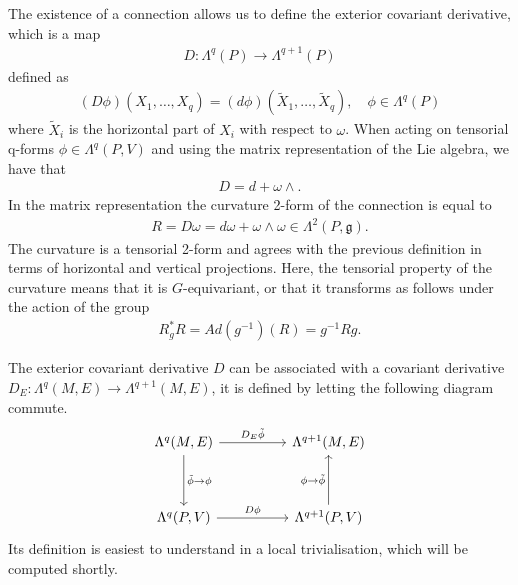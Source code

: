 \documentclass[10pt]{report}
\theoremstyle{definition}
\begin{document}
The existence of a connection allows us to define the exterior covariant derivative, which is a map
\begin{align}
    D : \Lambda^q(P) \rightarrow \Lambda^{q+1}(P)
\end{align}
defined as
\begin{align}
    (D \phi)(X_1,\ldots,X_q) = (d\phi)(\tilde{X}_1,\ldots,\tilde{X}_q), \quad \phi \in \Lambda^q(P)
\end{align}
where $\tilde{X}_i$ is the horizontal part of $X_i$ with respect to $\omega$. When acting on tensorial q-forms $\phi \in \Lambda^q(P,V)$ and using the matrix representation of the Lie algebra, we have that
\begin{align}
    D = d + \omega \wedge.
\end{align}
In the matrix representation the curvature 2-form of the connection is equal to
\begin{align}
    R = D\omega = d\omega + \omega \wedge \omega \in \Lambda^2 (P,\mathfrak{g}).
\end{align}
The curvature is a tensorial 2-form and agrees with the previous definition in terms of horizontal and vertical projections. Here, the tensorial property of the curvature means that it is $G$-equivariant, or that it transforms as follows under the action of the group
\begin{align}
    R_g^* R = Ad(g^{-1})(R) = g^{-1} R g.
\end{align}

The exterior covariant derivative $D$ can be associated with a covariant derivative $D_E : \Lambda^q(M,E) \rightarrow \Lambda^{q+1}(M,E)$, it is defined by letting the following diagram commute.
\begin{equation}
\begin{tikzcd}
{\Lambda^q(M,E)} \arrow[rr, "D_E \tilde{\phi}"] \arrow[dd, "\tilde{\phi} \rightarrow \phi"] &  & {\Lambda^{q+1}(M,E)} \\
&  &  \\
{\Lambda^q(P,V)} \arrow[rr, "D\phi"] &  & {\Lambda^{q+1}(P,V)} \arrow[uu, "\phi \rightarrow \tilde{\phi}"]
\end{tikzcd}
\end{equation}
Its definition is easiest to understand in a local trivialisation, which will be computed shortly.
\end{document}
